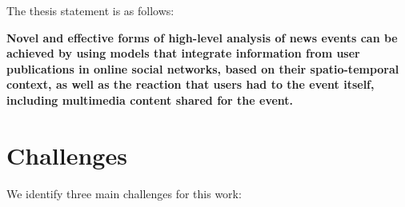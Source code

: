 The thesis statement is as follows:


\begin{tcolorbox}
        {\bf 
        Novel and effective forms of high-level analysis of news events can be
        achieved by using models that integrate information from user publications in
        online social networks, based on their spatio-temporal context, as well as the
        reaction that users had to the event itself, including multimedia content shared
        for the event.
        }
\end{tcolorbox}





\section{Challenges} 

We identify three main challenges for this work:

